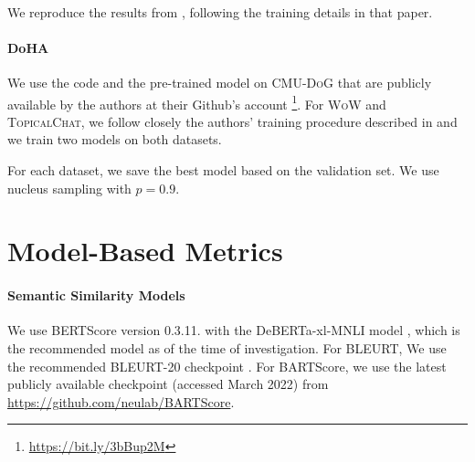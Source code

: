 \paragraph{\CTRL{}} We reproduce the results from \cite{rashkin-etal-2021-increasing}, following the training details in that paper.

\paragraph{DoHA} We use the code and the pre-trained model on \textsc{CMU-DoG} that are publicly available by the authors at their Github's account \footnote{\url{https://bit.ly/3bBup2M}}. For \textsc{WoW} and \textsc{TopicalChat}, we follow closely the authors' training procedure described in \citep{prabhumoye-etal-2021-focused} and we train two models on both datasets.  


For each dataset, we save the best model based on the validation set. We use nucleus sampling with $p=0.9$. 


\section{Model-Based Metrics}
\label{app:implementation-details-metrics}




\paragraph{Semantic Similarity Models}
We use BERTScore version 0.3.11. with the
DeBERTa-xl-MNLI model \cite{he2020deberta}, which is the recommended model as of the time of investigation. For BLEURT, We use the recommended
BLEURT-20 checkpoint \cite{pu-etal-2021-learning}. For BARTScore, we use the latest publicly available checkpoint (accessed March 2022) from \url{https://github.com/neulab/BARTScore}. 




